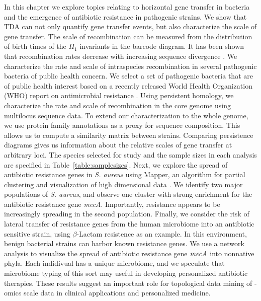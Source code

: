 
In this chapter we explore topics relating to horizontal gene transfer in bacteria and the emergence of antibiotic resistance in pathogenic strains.
We show that TDA can not only quantify gene transfer events, but also characterize the scale of gene transfer.
The scale of recombination can be measured from the distribution of birth times of the $H_1$ invariants in the barcode diagram.
It has been shown that recombination rates decrease with increasing sequence divergence \cite{Fraser:2007ep}.
We characterize the rate and scale of intraspecies recombination in several pathogenic bacteria of public health concern.
We select a set of pathogenic bacteria that are of public health interest based on a recently released World Health Organization (WHO) report on antimicrobial resistance \cite{WHO:2014wa}.
Using persistent homology, we characterize the rate and scale of recombination in the core genome using multilocus sequence data.
To extend our characterization to the whole genome, we use protein family annotations as a proxy for sequence composition.
This allows us to compute a similarity matrix between strains.
Comparing persistence diagrams gives us information about the relative scales of gene transfer at arbitrary loci.
The species selected for study and the sample sizes in each analysis are specified in Table~\ref{table:samplesizes}.
Next, we explore the spread of antibiotic resistance genes in \emph{S. aureus} using Mapper, an algorithm for partial clustering and visualization of high dimensional data \cite{Singh:2007ve}.
We identify two major populations of \emph{S. aureus}, and observe one cluster with strong enrichment for the antibiotic resistance gene \emph{mecA}.
Importantly, resistance appears to be increasingly spreading in the second population.
Finally, we consider the risk of lateral transfer of resistance genes from the human microbiome into an antibiotic sensitive strain, using $\beta$-Lactam resistence as an example.
In this environment, benign bacterial strains can harbor known resistance genes.
We use a network analysis to visualize the spread of antibiotic resistance gene $\emph{mecA}$ into nonnative phyla.
Each indidivual has a unique microbiome, and we speculate that microbiome typing of this sort may useful in developing personalized antibiotic therapies.
These results suggest an important role for topological data mining of -omics scale data in clinical applications and personalized medicine.

